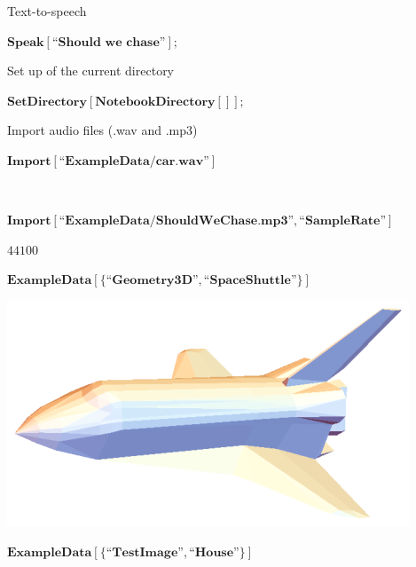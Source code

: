 \documentclass{report}
\begin{document}
Text-to-speech

\begin{doublespace}
\noindent\(\pmb{\text{Speak}[\text{{``}Should we chase{''}}];}\)
\end{doublespace}

Set up of the current directory

\begin{doublespace}
\noindent\(\pmb{\text{SetDirectory}[\text{NotebookDirectory}[]];}\)
\end{doublespace}

Import audio files (.wav and .mp3)

\begin{doublespace}
\noindent\(\pmb{\text{Import}[\text{{``}ExampleData/car.wav{''}}]}\)
\end{doublespace}

\begin{doublespace}
\noindent\(\)
\end{doublespace}

\begin{doublespace}
\noindent\(\pmb{\text{Import}[\text{{``}ExampleData/ShouldWeChase.mp3{''}},\text{{``}SampleRate{''}}]}\)
\end{doublespace}

\begin{doublespace}
\noindent\(44100\)
\end{doublespace}

\begin{doublespace}
\noindent\(\pmb{\text{ExampleData}[\{\text{{``}Geometry3D{''}},\text{{``}SpaceShuttle{''}}\}]}\)
\end{doublespace}

\includegraphics{GhassaneAniba_Signals_Systems_Oppenheim_Chap1_gr1.eps}

\begin{doublespace}
\noindent\(\pmb{\text{ExampleData}[\{\text{{``}TestImage{''}},\text{{``}House{''}}\}]}\)
\end{doublespace}
\end{document}
